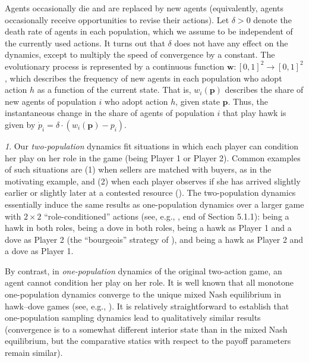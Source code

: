 \documentclass[12pt]{article}
\numberwithin{equation}{section}
\numberwithin{figure}{section}
\theoremstyle{definition}
\theoremstyle{plain}
\theoremstyle{plain}
\theoremstyle{plain}
\theoremstyle{remark}
\newtheorem{rem}{\protect\remarkname}
\theoremstyle{plain}
\theoremstyle{plain}
\providecommand{\remarkname}{Remark}
\begin{document}
Agents occasionally die and are replaced by new agents (equivalently,
agents occasionally receive opportunities
to revise their actions).
Let $\delta>0$ denote the death rate
of agents in each population, which we assume to be independent of
the currently used actions. It turns out that $\delta$ does not have any effect on the dynamics,
except to multiply the speed of convergence by a constant. 
The evolutionary process is represented by a continuous function
$\textbf{w}:\left[0,1\right]^{2}\rightarrow\left[0,1\right]^{2}$, which describes
the frequency of new agents in each population who adopt action $h$ as a function of the current state. That is, $w_{i}\left(\mathbf{p}\right)$
describes the share of new agents of population $i$ who adopt action
$h$, given state $\mathbf{p}$. 
Thus, the instantaneous change in the share of agents of population $i$ that play hawk is given by 
$\dot{p}_{i}=\delta\cdot\left(w_{i}\left(\mathbf{p}\right)-p_{i}\right).\label{eq:general-dyanmics}$

\begin{rem}\label{rem-two-one}
Our \emph{two-population} dynamics fit situations in which each player can condition
her play on her role in the game (being Player 1 or Player 2). Common examples of such situations are (1) when sellers are matched with buyers, as in the motivating example, and (2) when each player observes if she has arrived slightly earlier or slightly later at a contested resource (\citealp{smith1982evolution}).
The two-population dynamics essentially induce the same results as one-population dynamics over a larger game with  $2\times2$ “role-conditioned” actions 
(see, e.g., \citealp{weibull1997evolutionary}, end of Section 5.1.1): being a hawk in both roles, being a dove in both roles, being a hawk as Player 1 and a dove as Player 2 (the “bourgeois” strategy of \citealp{smith1982evolution}), and being a hawk as Player 2 and a dove as Player 1.

By contrast, in \emph{one-population} dynamics 
of the original two-action game, an agent cannot condition her play on her role. It is well known that all monotone one-population dynamics converge to the unique mixed Nash equilibrium in hawk--dove games 
(see, e.g., \citealp[Section 4.3.2]{weibull1997evolutionary}). It is relatively straightforward to establish that one-population sampling dynamics lead to qualitatively similar results (convergence is to a somewhat different interior state than in
the mixed Nash equilibrium, but the comparative statics with respect to the payoff parameters remain similar).
\end{rem}
\end{document}
